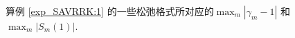 \begin{figure}[H]
	\begin{center}
	\caption{算例 \ref{exp_SAVRRK:1} 的一些松弛格式所对应的$\max_m\left|\gamma_m-1\right|$ 和 $\max_m\left|S_m(1)\right|$.}
	\label{fig_SAVRRK:1}
	\end{center}
	\end{figure}

